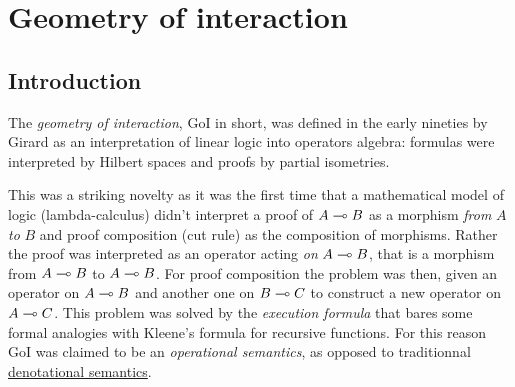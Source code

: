 \chapter{Geometry of interaction}\label{geometry-of-interaction}

\section{Introduction}

The \emph{geometry of interaction}, GoI in short, was defined in the
early nineties by Girard as an interpretation of linear logic into
operators algebra: formulas were interpreted by Hilbert spaces and
proofs by partial isometries.

This was a striking novelty as it was the first time that a mathematical
model of logic (lambda-calculus) didn't interpret a proof of
\(A\multimap B\) as a morphism \emph{from} \(A\) \emph{to} \(B\) and proof
composition (cut rule) as the composition of morphisms. Rather the proof
was interpreted as an operator acting \emph{on} \(A\multimap B\), that is a
morphism from \(A\multimap B\) to \(A\multimap B\). For proof composition the
problem was then, given an operator on \(A\multimap B\) and another one on
\(B\multimap C\) to construct a new operator on \(A\multimap C\). This problem
was solved by the \emph{execution formula} that bares some formal
analogies with Kleene's formula for recursive functions. For this reason
GoI was claimed to be an \emph{operational semantics}, as opposed to
traditionnal \hyperref[semantics]{denotational semantics}.

